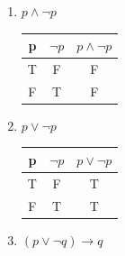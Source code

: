 \documentclass{article}
\begin{document}
\begin{enumerate}[label=\alph*)]
\item $p \land \neg p$
\smallbreak

\begin{tabular}{|c|c|c|}
    \hline
    p & $\neg p$ & $p \land \neg p$ \\
    \hline
    T & F & F \\
    F & T & F \\
\end{tabular}

\item $p \lor \neg p$

\smallbreak

\begin{tabular}{|c|c|c|}
    \hline
    p & $\neg p$ & $p \lor \neg p$ \\
    \hline
    T & F & T \\
    F & T & T \\
\end{tabular}

\item $(p \lor \neg q) \rightarrow q$\
\smallbreak


\end{enumerate}
\end{document}

